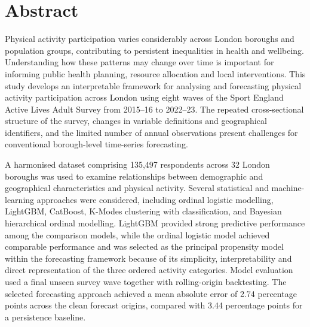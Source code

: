\documentclass[ %
                    author={Ashrey Ashrey, Sanya Kapoor, Trisha Sharma, Yash Bhooshan Pandloskar},
                supervisor={Dr. Dalila O’Grady},
                    degree={MSc},
                     title={Using machine learning to forecast physical activity participation, volunteering and activity patterns in London},
                  subtitle={},
                      type={},
                      year={2021}]{dissertation}
\begin{document}
\frontmatter


\makedecl


\tableofcontents
\listoffigures
\listoftables



\chapter*{Abstract}

Physical activity participation varies considerably across London boroughs and population groups, contributing to persistent inequalities in health and wellbeing. Understanding how these patterns may change over time is important for informing public health planning, resource allocation and local interventions. This study develops an interpretable framework for analysing and forecasting physical activity participation across London using eight waves of the Sport England Active Lives Adult Survey from 2015--16 to 2022--23. The repeated cross-sectional structure of the survey, changes in variable definitions and geographical identifiers, and the limited number of annual observations present challenges for conventional borough-level time-series forecasting.

A harmonised dataset comprising 135,497 respondents across 32 London boroughs was used to examine relationships between demographic and geographical characteristics and physical activity. Several statistical and machine-learning approaches were considered, including ordinal logistic modelling, LightGBM, CatBoost, K-Modes clustering with classification, and Bayesian hierarchical ordinal modelling. LightGBM provided strong predictive performance among the comparison models, while the ordinal logistic model achieved comparable performance and was selected as the principal propensity model within the forecasting framework because of its simplicity, interpretability and direct representation of the three ordered activity categories. Model evaluation used a final unseen survey wave together with rolling-origin backtesting. The selected forecasting approach achieved a mean absolute error of 2.74 percentage points across the clean forecast origins, compared with 3.44 percentage points for a persistence baseline.
\end{document}
